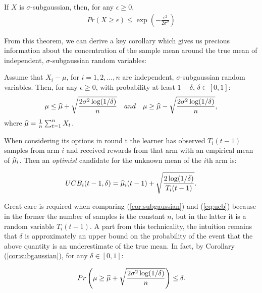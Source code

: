 \begin{theorem} \cite{lattimore2019bandit} 
If $X$ is $\sigma$-subgaussian, then, for any $\epsilon\geq 0$,
\begin{align*}
Pr(X\geq\epsilon)\leq\exp\left(-\frac{\epsilon^2}{2\sigma^2}\right)
\end{align*}
\end{theorem}

From this theorem, we can derive a key corollary which gives us precious information about the concentration of the sample mean around the true mean of independent, $\sigma$-subgaussian random variables: 

\begin{corollary} \label{cor:subgaussian}
Assume that $X_i - \mu$, for $i=1,2,\dots,n$ are independent, $\sigma$-subgaussian random variables. Then, for any $\epsilon\geq 0$, with probability at least $1-\delta$, $\delta\in [0,1]$: 
\begin{align*}
\mu\leq\widehat{\mu}+\sqrt{\frac{2\sigma^2\log(1/\delta)}{n}} \enspace\enspace and \enspace\enspace \mu\geq\widehat{\mu}-\sqrt{\frac{2\sigma^2\log(1/\delta)}{n}},
\end{align*}
where $\widehat{\mu}=\frac{1}{n}\sum_{t=1}^{n}X_t$.
\end{corollary}

When considering its options in round t the learner has observed $T_i(t-1)$ samples from arm $i$ and received rewards from that arm with an empirical mean of $\widehat{\mu}_i$. Then an \emph{optimist} candidate for the unknown mean of the $i$th arm is:

\begin{align} \label{eq:ucb}
UCB_i(t-1, \delta) = \widehat{\mu}_i(t-1) + \sqrt{\frac{2\log(1/\delta)}{T_i(t-1)}}.
\end{align}

Great care is required when comparing (\ref{cor:subgaussian}) and (\ref{eq:ucb}) because in the former the number of samples is the constant $n$, but in the latter it is a random variable
$T_i(t-1)$. A part from this technicality, the intuition remains that $\delta$ is approximately an upper bound on the probability of the event that the above quantity is an underestimate of the true mean. In fact, by Corollary (\ref{cor:subgaussian}), for any $\delta\in [0,1]$:

\begin{align}
Pr\left(\mu\geq\widehat{\mu}+\sqrt{\frac{2\sigma^2\log(1/\delta)}{n}}\right)\leq\delta.
\end{align}

